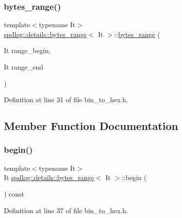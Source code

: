 \subsubsection{\texorpdfstring{bytes\+\_\+range()}{bytes\_range()}}
{\footnotesize\ttfamily template$<$typename It$>$ \\
\hyperlink{classspdlog_1_1details_1_1bytes__range}{spdlog\+::details\+::bytes\+\_\+range}$<$ It $>$\+::\hyperlink{classspdlog_1_1details_1_1bytes__range}{bytes\+\_\+range} (\begin{DoxyParamCaption}\item[{It}]{range\+\_\+begin,  }\item[{It}]{range\+\_\+end }\end{DoxyParamCaption})\hspace{0.3cm}{\ttfamily [inline]}}



Definition at line 31 of file bin\+\_\+to\+\_\+hex.\+h.



\subsection{Member Function Documentation}
\mbox{\label{classspdlog_1_1details_1_1bytes__range_abe7813dcd59c848fd56b0c33e5bbc134}} 
\subsubsection{\texorpdfstring{begin()}{begin()}}
{\footnotesize\ttfamily template$<$typename It$>$ \\
It \hyperlink{classspdlog_1_1details_1_1bytes__range}{spdlog\+::details\+::bytes\+\_\+range}$<$ It $>$\+::begin (\begin{DoxyParamCaption}{ }\end{DoxyParamCaption}) const\hspace{0.3cm}{\ttfamily [inline]}}



Definition at line 37 of file bin\+\_\+to\+\_\+hex.\+h.

\mbox{\label{classspdlog_1_1details_1_1bytes__range_a513faba7dd574f7a32f00504739d6032}} 
